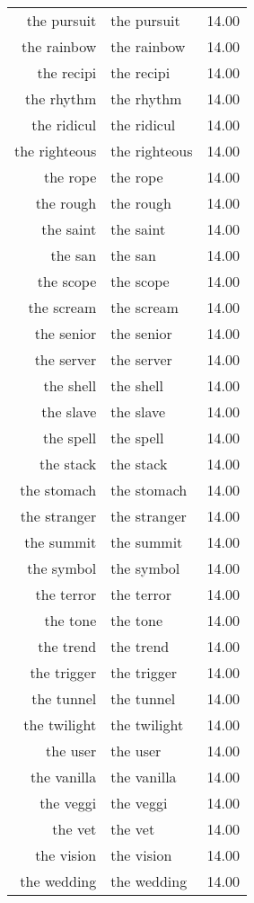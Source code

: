 \begin{table}[ht]
\begin{tabular}{rlr}
  the pursuit & the pursuit & 14.00 \\ 
  the rainbow & the rainbow & 14.00 \\ 
  the recipi & the recipi & 14.00 \\ 
  the rhythm & the rhythm & 14.00 \\ 
  the ridicul & the ridicul & 14.00 \\ 
  the righteous & the righteous & 14.00 \\ 
  the rope & the rope & 14.00 \\ 
  the rough & the rough & 14.00 \\ 
  the saint & the saint & 14.00 \\ 
  the san & the san & 14.00 \\ 
  the scope & the scope & 14.00 \\ 
  the scream & the scream & 14.00 \\ 
  the senior & the senior & 14.00 \\ 
  the server & the server & 14.00 \\ 
  the shell & the shell & 14.00 \\ 
  the slave & the slave & 14.00 \\ 
  the spell & the spell & 14.00 \\ 
  the stack & the stack & 14.00 \\ 
  the stomach & the stomach & 14.00 \\ 
  the stranger & the stranger & 14.00 \\ 
  the summit & the summit & 14.00 \\ 
  the symbol & the symbol & 14.00 \\ 
  the terror & the terror & 14.00 \\ 
  the tone & the tone & 14.00 \\ 
  the trend & the trend & 14.00 \\ 
  the trigger & the trigger & 14.00 \\ 
  the tunnel & the tunnel & 14.00 \\ 
  the twilight & the twilight & 14.00 \\ 
  the user & the user & 14.00 \\ 
  the vanilla & the vanilla & 14.00 \\ 
  the veggi & the veggi & 14.00 \\ 
  the vet & the vet & 14.00 \\ 
  the vision & the vision & 14.00 \\ 
  the wedding & the wedding & 14.00 \\ 

\end{tabular}
\end{table}
